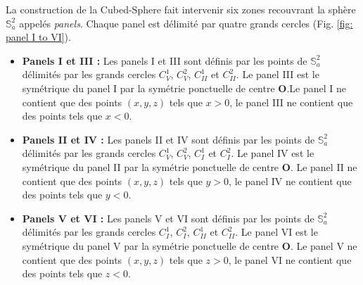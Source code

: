 La construction de la Cubed-Sphere fait intervenir six zones recouvrant la sphère $\mathbb{S}_a^2$ appelés \textit{panels}. Chaque panel est délimité par quatre grands cercles (Fig. \ref{fig: panel I to VI}).

\begin{definition}
\begin{itemize}
\item  \textbf{Panels I et III : }Les panels I et III sont définis par les points de $\mathbb{S}_a^2$ délimités par les grands cercles $C_V^1$, $C_V^2$, $C_{II}^1$ et $C_{II}^2$. Le panel III est le symétrique du panel I par la symétrie ponctuelle de centre $\mathbf{O}$.Le panel I ne contient que des points $(x,y,z)$ tels que $x>0$, le panel III ne contient que des points tels que $x<0$.
\item \textbf{Panels II et IV : }Les panels II et IV sont définis par les points de $\mathbb{S}_a^2$ délimités par les grands cercles $C_V^1$, $C_V^2$, $C_{I}^1$ et $C_{I}^2$. Le panel IV est le symétrique du panel II par la symétrie ponctuelle de centre $\mathbf{O}$. Le panel II ne contient que des points $(x,y,z)$ tels que $y>0$, le panel IV ne contient que des points tels que $y<0$.
\item \textbf{Panels V et VI : }Les panels V et VI sont définis par les points de $\mathbb{S}_a^2$ délimités par les grands cercles $C_I^1$, $C_I^2$, $C_{II}^1$ et $C_{II}^2$. Le panel VI est le symétrique du panel V par la symétrie ponctuelle de centre $\mathbf{O}$. Le panel V ne contient que des points $(x,y,z)$ tels que $z>0$, le panel VI ne contient que des points tels que $z<0$.
\end{itemize}
\end{definition}






